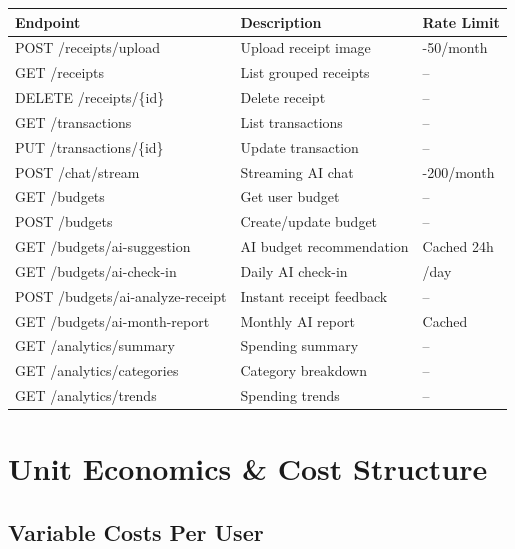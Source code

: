 \documentclass[11pt,a4paper]{report}
\begin{document}
\begin{center}
\renewcommand{\arraystretch}{1.3}
\small
\begin{tabular}{>{\raggedright\arraybackslash}p{4.5cm} >{\raggedright\arraybackslash}p{5cm} >{\centering\arraybackslash}p{2.5cm}}
\toprule
\rowcolor{miloprimary!15}
\textbf{Endpoint} & \textbf{Description} & \textbf{Rate Limit} \\
\midrule
POST /receipts/upload & Upload receipt image & 25-50/month \\
\rowcolor{lightbg}
GET /receipts & List grouped receipts & -- \\
DELETE /receipts/\{id\} & Delete receipt & -- \\
\rowcolor{lightbg}
GET /transactions & List transactions & -- \\
PUT /transactions/\{id\} & Update transaction & -- \\
\rowcolor{lightbg}
POST /chat/stream & Streaming AI chat & 100-200/month \\
GET /budgets & Get user budget & -- \\
\rowcolor{lightbg}
POST /budgets & Create/update budget & -- \\
GET /budgets/ai-suggestion & AI budget recommendation & Cached 24h \\
\rowcolor{lightbg}
GET /budgets/ai-check-in & Daily AI check-in & 1/day \\
POST /budgets/ai-analyze-receipt & Instant receipt feedback & -- \\
\rowcolor{lightbg}
GET /budgets/ai-month-report & Monthly AI report & Cached \\
GET /analytics/summary & Spending summary & -- \\
\rowcolor{lightbg}
GET /analytics/categories & Category breakdown & -- \\
GET /analytics/trends & Spending trends & -- \\
\bottomrule
\end{tabular}
\end{center}

\chapter{Unit Economics \& Cost Structure}

\section{Variable Costs Per User}
\end{document}
